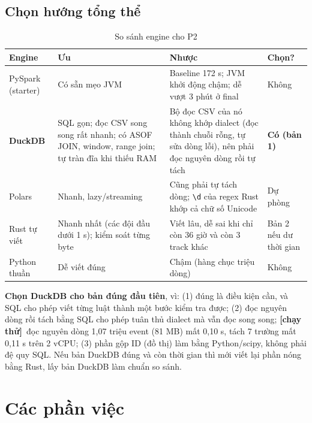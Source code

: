 \documentclass[a4paper,12pt]{article}
\newcommand{\trial}[1]{\textcolor{p5}{\textbf{[chạy thử]}~#1}}
\newcommand{\fn}[1]{\texttt{\detokenize{#1}}}
\begin{document}
\subsection{Chọn hướng tổng thể}
\begin{table}[H]
\centering\small
\begin{tabularx}{\textwidth}{L{2.6cm}YYC{1.5cm}}
\toprule
\textbf{Engine} & \textbf{Ưu} & \textbf{Nhược} & \textbf{Chọn?} \\
\midrule
PySpark (starter) & Có sẵn mẹo JVM & Baseline 172 s; JVM khởi động chậm; dễ vượt 3 phút ở final & Không \\
\textbf{DuckDB} & SQL gọn; đọc CSV song song rất nhanh; có ASOF JOIN, window, range join; tự tràn đĩa khi thiếu RAM & Bộ đọc CSV của nó không khớp dialect (đọc \fn{""} thành chuỗi rỗng, tự sửa dòng lỗi), nên phải đọc nguyên dòng rồi tự tách & \textbf{Có (bản 1)} \\
Polars & Nhanh, lazy/streaming & Cũng phải tự tách dòng; \texttt{\textbackslash d} của regex Rust khớp cả chữ số Unicode & Dự phòng \\
Rust tự viết & Nhanh nhất (các đội đầu dưới 1 s); kiểm soát từng byte & Viết lâu, dễ sai khi chỉ còn 36 giờ và còn 3 track khác & Bản 2 nếu dư thời gian \\
Python thuần & Dễ viết đúng & Chậm (hàng chục triệu dòng) & Không \\
\bottomrule
\end{tabularx}
\caption{So sánh engine cho P2}
\end{table}

\textbf{Chọn DuckDB cho bản đúng đầu tiên}, vì: (1) đúng là điều kiện cần, và SQL cho phép viết từng luật thành một bước kiểm tra được; (2) đọc nguyên dòng rồi tách bằng SQL cho phép tuân thủ dialect mà vẫn đọc song song; \trial{đọc nguyên dòng 1,07 triệu event (81 MB) mất 0,10 s, tách 7 trường mất 0,11 s trên 2 vCPU}; (3) phần gộp ID (đồ thị) làm bằng Python/scipy, không phải đệ quy SQL. Nếu bản DuckDB đúng và còn thời gian thì mới viết lại phần nóng bằng Rust, lấy bản DuckDB làm chuẩn so sánh.

\newpage
\section{Các phần việc}

\end{document}
